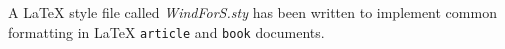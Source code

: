 A LaTeX style file called \emph{WindForS.sty} has been written to implement common formatting in LaTeX \texttt{article} and \texttt{book} documents.